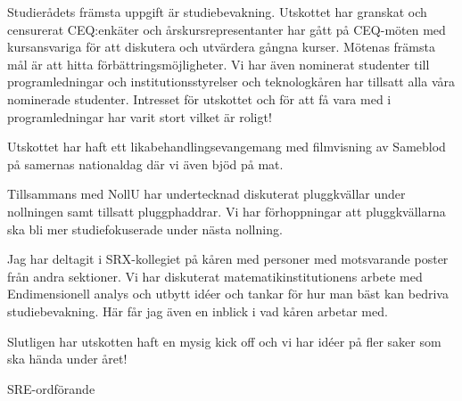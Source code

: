 \documentclass[../_main/handlingar.tex]{subfiles}
\begin{document}
Studierådets främsta uppgift är studiebevakning. Utskottet har granskat och censurerat CEQ:enkäter och årskursrepresentanter har gått på CEQ-möten med kursansvariga för att diskutera och utvärdera gångna kurser. Mötenas främsta mål är att hitta förbättringsmöjligheter. Vi har även nominerat studenter till programledningar och institutionsstyrelser och teknologkåren har tillsatt alla våra nominerade studenter. Intresset för utskottet och för att få vara med i programledningar har varit stort vilket är roligt!

Utskottet har haft ett likabehandlingsevangemang med filmvisning av Sameblod på samernas nationaldag där vi även bjöd på mat.

Tillsammans med NollU har undertecknad diskuterat pluggkvällar under nollningen samt tillsatt pluggphaddrar. Vi har förhoppningar att pluggkvällarna ska bli mer studiefokuserade under nästa nollning.

Jag har deltagit i SRX-kollegiet på kåren med personer med motsvarande poster från andra sektioner. Vi har diskuterat matematikinstitutionens arbete med Endimensionell analys och utbytt idéer och tankar för hur man bäst kan bedriva studiebevakning. Här får jag även en inblick i vad kåren arbetar med.

Slutligen har utskotten haft en mysig kick off och vi har idéer på fler saker som ska hända under året!
\begin{signatures}{1}
    \mvh
    \signature{Fanny Månefjord}{SRE-ordförande}
\end{signatures}
\end{document}

